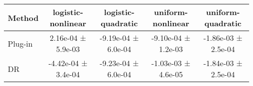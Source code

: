 \begin{tabular}{lcccc}
\toprule
Method & logistic-nonlinear & logistic-quadratic & uniform-nonlinear & uniform-quadratic \\
\midrule
Plug-in & 2.16e-04 ± 5.9e-03 & -9.19e-04 ± 6.0e-04 & -9.10e-04 ± 1.2e-03 & -1.86e-03 ± 2.5e-04 \\
DR & -4.42e-04 ± 3.4e-04 & -9.23e-04 ± 6.0e-04 & -1.03e-03 ± 4.6e-05 & -1.84e-03 ± 2.5e-04 \\
\bottomrule
\end{tabular}
